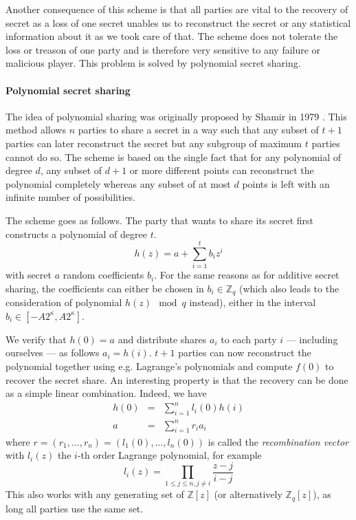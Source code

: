 Another consequence of this scheme is that all parties are vital to the recovery of secret as a loss of one secret unables us to reconstruct the secret or any statistical information about it as we took care of that. The scheme does not tolerate the loss or treason of one party and is therefore very sensitive to any failure or malicious player. This problem is solved by polynomial secret sharing.

\paragraph{Polynomial secret sharing}
The idea of polynomial sharing was originally proposed by Shamir in 1979 \cite{Shamir1979HowSecret}. This method allows $n$ parties to share a secret in a way such that any subset of $t+1$ parties can later reconstruct the secret but any subgroup of maximum $t$ parties cannot do so. The scheme is based on the single fact that for any polynomial of degree $d$, any subset of $d+1$ or more different points can reconstruct the polynomial completely whereas any subset of at most $d$ points is left with an infinite number of possibilities.

The scheme goes as follows. The party that wants to share its secret first constructs a polynomial of degree $t$.
\begin{equation}
    h(z) = a + \sum_{i=1}^t b_i z^i
\end{equation}
with secret $a$ random coefficients $b_i$. For the same reasons as for additive secret sharing, the coefficients can either be chosen in $b_i \in \mathbb{Z}_q$ (which also leads to the consideration of polynomial $h(z) \mod q$ instead), either in the interval $b_i \in \left[-A2^\kappa,A2^\kappa\right]$.

We verify that $h(0)=a$ and distribute shares $a_i$ to each party $i$ --- including ourselves --- as follows $a_i=h(i)$. $t+1$ parties can now reconstruct the polynomial together using e.g. Lagrange's polynomials and compute $f(0)$ to recover the secret share. An interesting property is that the recovery can be done as a simple linear combination. Indeed, we have
\begin{eqnarray}
    h(0) &=& \sum_{i=1}^{n} l_i(0)h(i) \\
    a &=& \sum_{i=1}^{n} r_ia_i
    \label{eqn:recover-secret}
\end{eqnarray}
where $r = \left(r_1, \ldots , r_n\right) = \left(l_1(0), \ldots , l_n(0)\right)$ is called the \emph{recombination vector} with $l_i(z)$ the $i$-th order Lagrange polynomial, for example
\begin{equation*}
    l_i(z) = \prod_{1\leq j \leq n,j\neq i}\frac{z-j}{i-j}
\end{equation*}
This also works with any generating set of $\mathbb{Z}\left[z\right]$ (or alternatively $\mathbb{Z}_q\left[z\right]$), as long all parties use the same set.